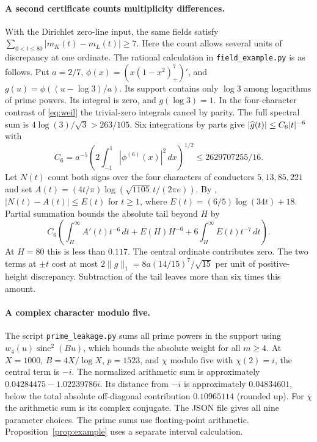 \documentclass[11pt]{article}
\newcommand{\dd}{\,d}\DeclareMathOperator{\sinc}{sinc}
\begin{document}
\paragraph{A second certificate counts multiplicity differences.}
With the Dirichlet zero-line input, the same fields satisfy
$\sum_{0<t\le80}|m_K(t)-m_L(t)|\ge7$. Here the count allows several
units of discrepancy at one ordinate. The rational calculation in
\texttt{field\_example.py} is as follows. Put $a=2/7$,
$\phi(x)=(x(1-x^2)_+^7)'$, and $g(u)=\phi((u-\log3)/a)$. Its support
contains only $\log3$ among logarithms of prime powers. Its integral is
zero, and $g(\log3)=1$. In the four-character contrast of
\eqref{eq:weil} the trivial-zero integrals cancel by parity. The full
spectral sum is $4\log(3)/\sqrt3>263/105$. Six integrations by parts give
$|\widehat g(t)|\le C_6 |t|^{-6}$ with
\[
 C_6=a^{-5}\left(2\int_{-1}^1|\phi^{(6)}(x)|^2\dd x\right)^{1/2}
 \le 2629707255/16 .
\]
Let $N(t)$ count both signs over the four characters of conductors
$5,13,85,221$ and set $A(t)=(4t/\pi)\log(\sqrt{1105}\,t/(2\pi e))$.
By \cite[Corollary 1.2]{count}, $|N(t)-A(t)|\le E(t)$ for $t\ge1$,
where $E(t)=(6/5)\log(34t)+18$. Partial summation bounds the absolute
tail beyond $H$ by
\[
 C_6\left(\int_H^\infty A'(t)t^{-6}\dd t+E(H)H^{-6}
                   +6\int_H^\infty E(t)t^{-7}\dd t\right).
\]
At $H=80$ this is less than $0.117$. The central ordinate contributes
zero. The two terms at $\pm t$ cost at most
$2\|g\|_1=8a(14/15)^7/\sqrt{15}$ per unit of positive-height
discrepancy. Subtraction of the tail leaves more than six times this amount.

\paragraph{A complex character modulo five.}
The script \texttt{prime\_leakage.py} sums all prime powers
in the support using $w_4(u)\sinc^2(Bu)$, which bounds the absolute
weight for all $m\ge4$. At $X=1000$, $B=4X/\log X$, $p=1523$, and
$\chi$ modulo five with $\chi(2)=i$, the central term is $-i$.
The normalized arithmetic sum is approximately
$0.04284475-1.02239786i$. Its distance from $-i$ is approximately $0.04834601$,
below the total absolute off-diagonal contribution $0.10965114$ (rounded
up). For $\bar\chi$ the arithmetic sum is its complex conjugate. The
JSON file gives all nine parameter choices. The prime sums use floating-point arithmetic. Proposition~\ref{prop:example} uses a
separate interval calculation.
\end{document}
